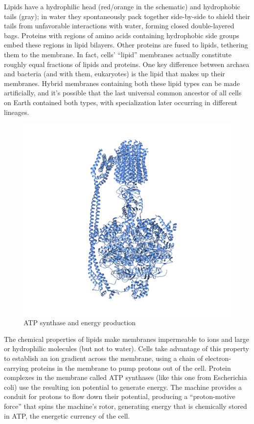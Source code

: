 \documentclass[]{tufte-book}
\begin{document}
Lipids have a hydrophilic head (red/orange in the schematic) and
hydrophobic tails (gray); in water they spontaneously pack together
side-by-side to shield their tails from unfavorable interactions with
water, forming closed double-layered bags. Proteins with regions of
amino acids containing hydrophobic side groups embed these regions in
lipid bilayers. Other proteins are fused to lipids, tethering them to
the membrane. In fact, cells' ``lipid'' membranes actually constitute
roughly equal fractions of lipids and proteins. One key difference
between archaea and bacteria (and with them, eukaryotes) is the lipid
that makes up their membranes. Hybrid membranes containing both these
lipid types can be made artificially, and it's possible that the last
universal common ancestor of all cells on Earth contained both types,
with specialization later occurring in different lineages.

\begin{figure}
\includegraphics{img/02_schematic/2_1_2_ATPsynthase} \caption[ATP synthase and energy production]{ATP synthase and energy production}\label{fig:2-1-2}
\end{figure}

The chemical properties of lipids make membranes impermeable to ions and
large or hydrophilic molecules (but not to water). Cells take advantage
of this property to establish an ion gradient across the membrane, using
a chain of electron-carrying proteins in the membrane to pump protons
out of the cell. Protein complexes in the membrane called ATP synthases
(like this one from Escherichia coli) use the resulting ion potential to
generate energy. The machine provides a conduit for protons to flow down
their potential, producing a ``proton-motive force'' that spins the
machine's rotor, generating energy that is chemically stored in ATP, the
energetic currency of the cell.
\end{document}
